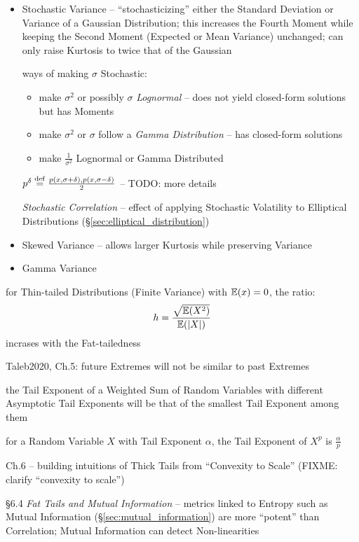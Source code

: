 \begin{itemize}
  \item Stochastic Variance -- ``stochasticizing'' either the Standard Deviation
    or Variance of a Gaussian Distribution; this increases the Fourth Moment
    while keeping the Second Moment (Expected or Mean Variance) unchanged; can
    only raise Kurtosis to twice that of the Gaussian

    ways of making $\sigma$ Stochastic:
    \begin{itemize}
      \item make $\sigma^2$ or possibly $\sigma$ \emph{Lognormal} -- does not
        yield closed-form solutions but has Moments
      \item make $\sigma^2$ or $\sigma$ follow a \emph{Gamma Distribution}
        -- has closed-form solutions
      \item make $\frac{1}{\sigma^2}$ Lognormal or Gamma Distributed
    \end{itemize}

    $p^\delta \stackrel{\mathrm{def}}= \frac{p(x, \sigma + \delta), p(x, \sigma - \delta)}{2}$
    -- TODO: more details

    \emph{Stochastic Correlation} -- effect of applying Stochastic Volatility to
    Elliptical Distributions (\S\ref{sec:elliptical_distribution})
  \item Skewed Variance -- allows larger Kurtosis while preserving Variance
  \item Gamma Variance
\end{itemize}

for Thin-tailed Distributions (Finite Variance) with $\mathbb{E}(x) = 0$, the
ratio:
\[
  h = \frac{\sqrt{\mathbb{E}(X^2)}}{\mathbb{E}(|X|)}
\]
incrases with the Fat-tailedness

Taleb2020, Ch.5: future Extremes will not be similar to past Extremes

the Tail Exponent of a Weighted Sum of Random Variables with different
Asymptotic Tail Exponents will be that of the smallest Tail Exponent among them

for a Random Variable $X$ with Tail Exponent $\alpha$, the Tail Exponent of
$X^p$ is $\frac{\alpha}{p}$

Ch.6 -- building intuitions of Thick Tails from ``Convexity to Scale'' (FIXME:
clarify ``convexity to scale'')

\S 6.4 \emph{Fat Tails and Mutual Information}
-- metrics linked to Entropy such as Mutual Information
(\S\ref{sec:mutual_information}) are more ``potent'' than Correlation; Mutual
Information can detect Non-linearities

